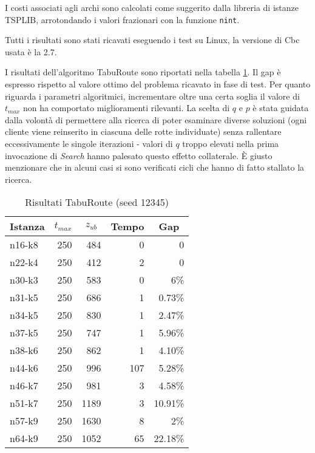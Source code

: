 \documentclass[11pt,oneside,a4paper]{article}
\begin{document}
I costi associati agli archi sono calcolati come suggerito dalla libreria di istanze TSPLIB, arrotondando i
valori frazionari con la funzione \texttt{nint}.

Tutti i risultati sono stati ricavati eseguendo i test su Linux, la versione di Cbc usata è la 2.7.

I risultati dell'algoritmo TabuRoute sono riportati nella tabella \ref{t_res:meta}.
Il gap è espresso rispetto al valore ottimo del problema ricavato in fase di test.
Per quanto riguarda i parametri algoritmici, incrementare oltre una certa soglia il valore di $t_{max}$
non ha comportato miglioramenti rilevanti. La scelta di $q$ e $p$ è stata guidata dalla volontà di permettere
alla ricerca di poter esaminare diverse soluzioni (ogni cliente viene reinserito in ciascuna delle rotte
individuate) senza rallentare eccessivamente le singole iterazioni - valori di $q$ troppo elevati
nella prima invocazione di \emph{Search} hanno palesato questo effetto collaterale. È giusto menzionare che in
alcuni casi si sono verificati cicli che hanno di fatto stallato la ricerca.

\begin{table}
\centering
\begin{tabular}{|p{1.8cm}|r|r|r|r|}

\hline
Istanza &
\multicolumn{1}{c|}{$t_{max}$} &
\multicolumn{1}{c|}{$z_{ub}$} &
\multicolumn{1}{c|}{Tempo} &
\multicolumn{1}{c|}{Gap} \\
\hline
n16-k8 &250& 484 & 0 & 0  \\
n22-k4 &250& 412 & 2 & 0 \\
n30-k3 &250& 583 & 0 & 6\% \\
n31-k5 &250& 686 & 1 & 0.73\% \\
n34-k5 &250& 830 & 1 & 2.47\% \\
n37-k5 &250& 747 & 1 & 5.96\% \\
n38-k6 &250& 862 & 1 & 4.10\% \\
n44-k6 &250& 996 & 107 & 5.28\% \\ 
n46-k7 &250& 981 & 3 & 4.58\% \\
n51-k7 &250& 1189 & 3 & 10.91\% \\ 
n57-k9 &250& 1630 & 8 & 2\% \\
n64-k9 &250& 1052 & 65 & 22.18\% \\
\hline

\end{tabular}
\caption{Risultati TabuRoute (seed 12345)}\label{t_res:meta}
\end{table}
\end{document}
